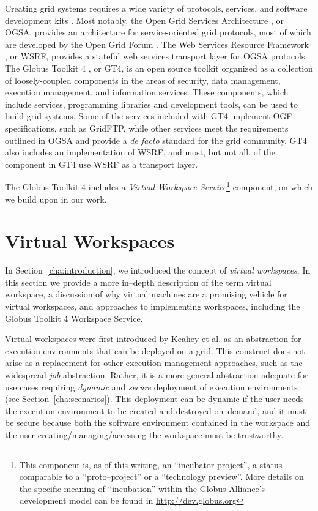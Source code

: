 Creating grid systems requires a wide variety of protocols, services, and software development kits \cite{anatomy}. Most notably, the Open Grid Services Architecture \cite{physiology, ogsa, ogsaweb}, or OGSA, provides an architecture for service-oriented grid protocols, most of which are developed by the Open Grid Forum \cite{ogfweb}. The Web Services Resource Framework \cite{wsrfweb}, or WSRF, provides a stateful web services transport layer for OGSA protocols. The Globus Toolkit 4 \cite{globusweb,gt4book}, or GT4,  is an open source toolkit organized as a collection of loosely-coupled components in the areas of security, data management, execution management, and information services. These components, which include services, programming libraries and development tools, can be used to build grid systems. Some of the services included with GT4 implement OGF specifications, such as GridFTP, while other services meet the requirements outlined in OGSA and provide a \emph{de facto} standard for the grid community. GT4 also includes an implementation of WSRF, and most, but not all, of the component in GT4 use WSRF as a transport layer.

The Globus Toolkit 4 includes a \emph{Virtual Workspace Service}\footnote{This component is, as of this writing, an ``incubator project'', a status comparable to a ``proto--project'' or a ``technology preview''. More details on the specific meaning of ``incubation'' within the Globus Alliance's development model can be found in \url{http://dev.globus.org}} component, on which we build upon in our work.

\section{Virtual Workspaces}
\label{sec:vw}

In Section~\ref{cha:introduction}, we introduced the concept of \emph{virtual workspaces}. In this section we provide a more in--depth description of the term virtual workspace, a discussion of why virtual machines are a promising vehicle for virtual workspaces, and approaches to implementing workspaces, including the Globus Toolkit 4 Workspace Service.

Virtual workspaces were first introduced by Keahey et al.\cite{VirtualWorkspaces05} as an abstraction for execution environments that can be deployed on a grid. This construct does not arise as a replacement for other execution management approaches, such as the widespread \emph{job} abstraction. Rather, it is a more general abstraction adequate for use cases requiring \emph{dynamic} and \emph{secure} deployment of execution environments (see Section~\ref{cha:scenarios}). This deployment can be dynamic if the user needs the execution environment to be created and destroyed on--demand, and it must be secure because both the software environment contained in the workspace and the user creating/managing/accessing the workspace must be trustworthy.

